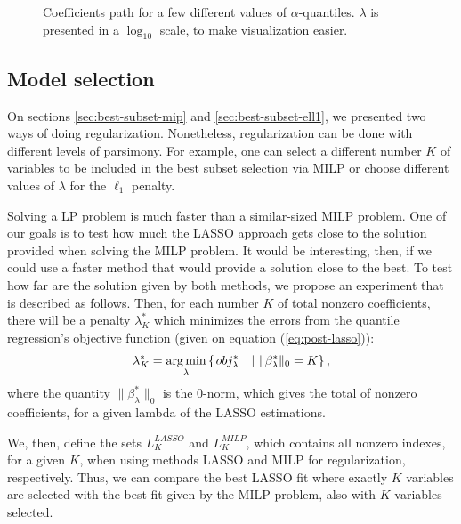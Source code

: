 \begin{figure}
\begin{minipage}[t]{0.4\linewidth}
\begin{minipage}[b]{\linewidth}
		\end{minipage}
	\end{minipage}
	\caption{Coefficients path for a few different values of $\alpha$-quantiles. $\lambda$ is presented in a $\log_{10}$ scale, to make visualization easier.}
	\label{fig:lasso-results}
\end{figure}


\subsection{Model selection}

On sections \ref{sec:best-subset-mip} and \ref{sec:best-subset-ell1}, we presented two ways of doing regularization. Nonetheless, regularization can be done with different levels of parsimony. For example, one can select a different number $K$ of variables to be included in the best subset selection via MILP or choose different values of $\lambda$ for the $\ell_1$ penalty. 


Solving a LP problem is much faster than a similar-sized MILP problem. One of our goals is to test how much the LASSO approach gets close to the solution provided when solving the MILP problem. It would be interesting, then, if we could use a faster method that would provide a solution close to the best. To test how far are the solution given by both methods, we propose an experiment that is described as follows. Then, for each number $K$ of total nonzero coefficients, there will be a penalty $\lambda^*_K$ which minimizes the errors from the quantile regression's objective function (given on equation (\ref{eq:post-lasso})): 
\begin{equation}
\lambda^*_K = \operatorname*{arg\,min}_\lambda \left\lbrace \left.  obj_{\lambda}^{*} \quad  \right| \, \| \beta^*_\lambda \|_0 = K \right\rbrace,
\end{equation}
where the quantity $\| \beta^*_\lambda \|_0$ is the $0$-norm, which gives the total of nonzero coefficients, for a given lambda of the LASSO estimations.

We, then, define the sets $L_K^{LASSO}$ and $L_K^{MILP}$, which contains all nonzero indexes, for a given $K$, when using methods LASSO and MILP for regularization, respectively.
Thus, we can compare the best LASSO fit where exactly $K$ variables are selected with the best fit given by the MILP problem, also with $K$ variables selected.

